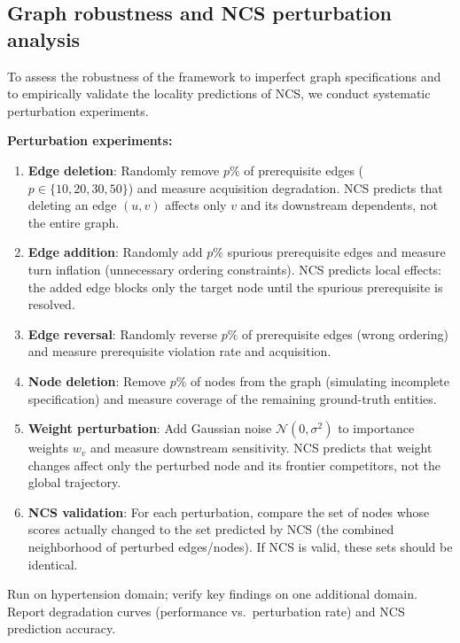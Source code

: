 \documentclass[11pt,a4paper]{article}
\newcommand{\placeholder}[1]{%
  \begin{tcolorbox}[colback=yellow!10,colframe=orange!60!black,
    fonttitle=\bfseries,title=Placeholder]
    #1
  \end{tcolorbox}%
}
\begin{document}
\subsection{Graph robustness and NCS perturbation analysis}
\label{sec:methods_robustness}

To assess the robustness of the framework to imperfect graph specifications
and to empirically validate the locality predictions of NCS, we conduct
systematic perturbation experiments.

\placeholder{%
  \textbf{Perturbation experiments:}
  \begin{enumerate}[noitemsep]
    \item \textbf{Edge deletion}: Randomly remove $p\%$ of prerequisite edges
          ($p \in \{10, 20, 30, 50\}$) and measure acquisition degradation.
          NCS predicts that deleting an edge $(u, v)$ affects only $v$ and
          its downstream dependents, not the entire graph.
    \item \textbf{Edge addition}: Randomly add $p\%$ spurious prerequisite
          edges and measure turn inflation (unnecessary ordering constraints).
          NCS predicts local effects: the added edge blocks only the target
          node until the spurious prerequisite is resolved.
    \item \textbf{Edge reversal}: Randomly reverse $p\%$ of prerequisite
          edges (wrong ordering) and measure prerequisite violation rate and
          acquisition.
    \item \textbf{Node deletion}: Remove $p\%$ of nodes from the graph
          (simulating incomplete specification) and measure coverage of
          the remaining ground-truth entities.
    \item \textbf{Weight perturbation}: Add Gaussian noise
          $\mathcal{N}(0, \sigma^2)$ to importance weights $w_v$ and measure
          downstream sensitivity. NCS predicts that weight changes affect
          only the perturbed node and its frontier competitors, not the
          global trajectory.
    \item \textbf{NCS validation}: For each perturbation, compare the set of
          nodes whose scores actually changed to the set predicted by NCS
          (the combined neighborhood of perturbed edges/nodes). If NCS is
          valid, these sets should be identical.
  \end{enumerate}
  Run on hypertension domain; verify key findings on one additional domain.
  Report degradation curves (performance vs.\ perturbation rate) and NCS
  prediction accuracy.
}
\end{document}
